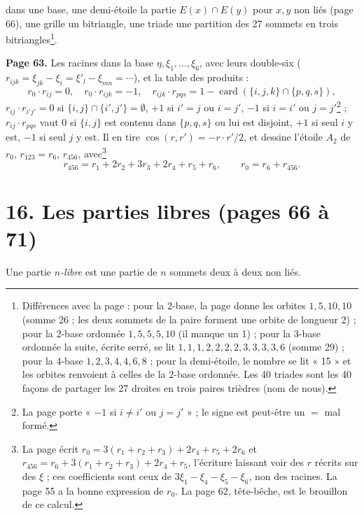 \documentclass[11pt,a4paper]{article}
\begin{document}
dans une base, une demi-étoile la partie $E(x) \cap E(y)$ pour $x, y$ non liés
(page 66), une grille un bitriangle, une triade une partition des 27 sommets en
trois bitriangles\footnote{Différences avec la page : pour la 2-base, la page
donne les orbites $1, 5, 10, 10$ (somme 26 ; les deux sommets de la paire
forment une orbite de longueur 2) ; pour la 2-base ordonnée $1, 5, 5, 5, 10$
(il manque un 1) ; pour la 3-base ordonnée la suite, écrite serré, se lit
$1,1,1,2,2,2,2,3,3,3,3,6$ (somme 29) ; pour la 4-base $1, 2, 3, 4, 4, 6, 8$ ;
pour la demi-étoile, le nombre se lit « 15 » et les orbites renvoient à celles
de la 2-base ordonnée. Les 40 triades sont les 40 façons de partager les 27
droites en trois paires trièdres (nom de nous).}.

\textbf{Page 63.} Les racines dans la base $\eta, \xi_1, \ldots, \xi_6$, avec
leurs double-six ($r_{ijk} = \xi_{jk} - \xi_i = \xi'_l - \xi_{mn} = \cdots$),
et la table des produits :
\[
r_0 \cdot r_{ij} = 0, \quad r_0 \cdot r_{ijk} = -1, \quad r_{ijk} \cdot
r_{pqs} = 1 - \operatorname{card}(\lbrace i,j,k\rbrace \cap \lbrace
p,q,s\rbrace),
\]
$r_{ij} \cdot r_{i'j'} = 0$ si $\lbrace i,j\rbrace \cap \lbrace i',j'\rbrace =
\emptyset$, $+1$ si $i' = j$ ou $i = j'$, $-1$ si $i = i'$ ou $j =
j'$\footnote{La page porte « $-1$ si $i \neq i'$ ou $j = j'$ » ; le signe est
peut-être un $=$ mal formé.} ; $r_{ij} \cdot r_{pqs}$ vaut $0$ si $\lbrace i,
j\rbrace$ est contenu dans $\lbrace p, q, s\rbrace$ ou lui est disjoint, $+1$ si
seul $i$ y est, $-1$ si seul $j$ y est. Il en tire $\cos\widehat{(r, r')} = -
r \cdot r'/2$, et dessine l'étoile $A_2$ de $r_0$, $r_{123} = r_6$,
$r_{456}$, avec\footnote{La page écrit $r_0 = 3(r_1 + r_2 + r_3) + 2r_4 + r_5 + 2r_6$ et
$r_{456} = r_6 + 3(r_1 + r_2 + r_3) + 2r_4 + r_5$, l'écriture laissant voir
des $r$ récrits sur des $\xi$ ; ces coefficients sont ceux de $3\xi_1 - \xi_4
- \xi_5 - \xi_6$, non des racines. La page 55 a la bonne expression de $r_0$.
La page 62, tête-bêche, est le brouillon de ce calcul.}
\[
r_{456} = r_1 + 2r_2 + 3r_3 + 2r_4 + r_5 + r_6, \qquad r_0 = r_6 + r_{456} .
\]

\section*{16. Les parties libres (pages 66 à 71)}

Une partie \emph{$n$-libre} est une partie de $n$ sommets deux à deux non
liés.
\end{document}
